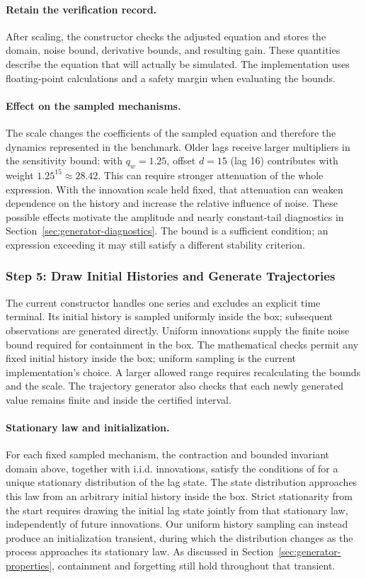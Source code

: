 \paragraph{Retain the verification record.}
After scaling, the constructor checks the adjusted equation and stores the
domain, noise bound, derivative bounds, and resulting gain. These quantities
describe the equation that will actually be simulated. The implementation
uses floating-point calculations and a safety margin when evaluating the
bounds.

\paragraph{Effect on the sampled mechanisms.}
The scale changes the coefficients of the sampled equation and therefore
the dynamics represented in the benchmark. Older lags receive larger
multipliers in the sensitivity bound: with $q_w=1.25$, offset $d=15$
(lag 16) contributes with weight $1.25^{15}\approx28.42$. This can require
stronger attenuation of the whole expression. With the innovation scale
held fixed, that attenuation can weaken dependence on the history and
increase the relative influence of noise. These possible effects motivate
the amplitude and nearly constant-tail diagnostics in
Section~\ref{sec:generator-diagnostics}. The bound is a sufficient condition;
an expression exceeding it may still satisfy a different stability criterion.

\subsubsection{Step 5: Draw Initial Histories and Generate Trajectories}
The current constructor handles one series and excludes an explicit time
terminal. Its initial history is sampled uniformly inside the box; subsequent
observations are generated directly. Uniform innovations supply the finite
noise bound required for containment in the box.
The mathematical checks permit any fixed initial history inside the box;
uniform sampling is the current implementation's choice. A larger allowed
range requires recalculating the bounds and the scale. The trajectory
generator also checks that each newly generated value remains finite and
inside the certified interval.

\paragraph{Stationary law and initialization.}
For each fixed sampled mechanism, the contraction and bounded invariant
domain above, together with i.i.d. innovations, satisfy the conditions of
\citet[Theorem~1]{diaconis1999iterated} for a unique stationary distribution
of the lag state. The state distribution approaches this law from an
arbitrary initial history inside the box. Strict stationarity from the
start requires drawing the initial lag state jointly from that stationary
law, independently of future innovations. Our uniform history sampling can
instead produce an initialization transient, during which the distribution
changes as the process approaches its stationary law. As discussed in
Section~\ref{sec:generator-properties}, containment and forgetting still
hold throughout that transient.

